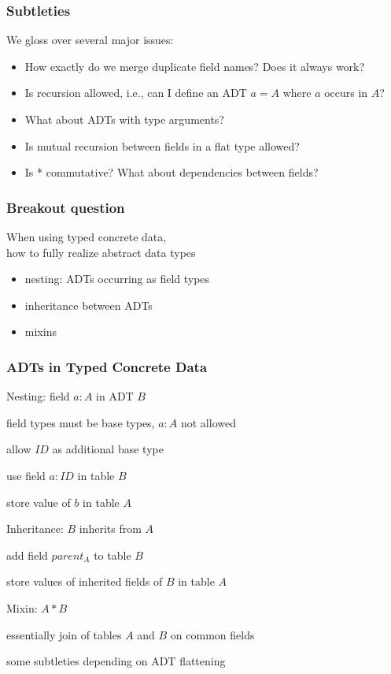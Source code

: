 \begin{frame}\frametitle{Subtleties}
We gloss over several major issues:
\begin{itemize}
\item How exactly do we merge duplicate field names? Does it always work?
\item Is recursion allowed, i.e., can I define an ADT $a=A$ where $a$ occurs in $A$?
\item What about ADTs with type arguments?
\item Is mutual recursion between fields in a flat type allowed?
\item Is * commutative? What about dependencies between fields?
\end{itemize}
\end{frame}

\begin{frame}\frametitle{Breakout question}
When using typed concrete data,\\
how to fully realize abstract data types
\begin{itemize}
\item nesting: ADTs occurring as field types
\item inheritance between ADTs
\item mixins
\end{itemize}
\end{frame}

\begin{frame}\frametitle{ADTs in Typed Concrete Data}
\begin{blockitems}{Nesting: field $a:A$ in ADT $B$}
\item field types must be base types, $a:A$ not allowed
\item allow $ID$ as additional base type
\item use field $a:ID$ in table $B$
\item store value of $b$ in table $A$
\end{blockitems}

\begin{blockitems}{Inheritance: $B$ inherits from $A$}
\item add field $parent_A$ to table $B$
\item store values of inherited fields of $B$ in table $A$
\end{blockitems}

\begin{blockitems}{Mixin: $A*B$}
\item essentially join of tables $A$ and $B$ on common fields
\item some subtleties depending on ADT flattening
\end{blockitems}
\end{frame}